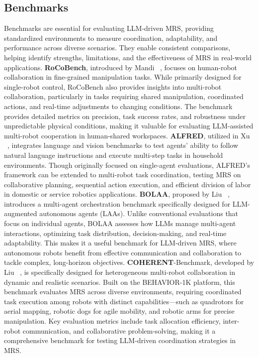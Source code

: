 \subsection{Benchmarks} 
Benchmarks are essential for evaluating LLM-driven MRS, providing standardized environments to measure coordination, adaptability, and performance across diverse scenarios. They enable consistent comparisons, helping identify strengths, limitations, and the effectiveness of MRS in real-world applications.
\textbf{RoCoBench}, introduced by Mandi \etal~\cite{mandi_roco_2024}, focuses on human-robot collaboration in fine-grained manipulation tasks. While primarily designed for single-robot control, RoCoBench also provides insights into multi-robot collaboration, particularly in tasks requiring shared manipulation, coordinated actions, and real-time adjustments to changing conditions. The benchmark provides detailed metrics on precision, task success rates, and robustness under unpredictable physical conditions, making it valuable for evaluating LLM-assisted multi-robot cooperation in human-shared workspaces.
\textbf{ALFRED}, utilized in Xu \etal~\cite{xu_scaling_2024}, integrates language and vision benchmarks to test agents' ability to follow natural language instructions and execute multi-step tasks in household environments. Though originally focused on single-agent evaluations, ALFRED's framework can be extended to multi-robot task coordination, testing MRS on collaborative planning, sequential action execution, and efficient division of labor in domestic or service robotics applications.
\textbf{BOLAA}, proposed by Liu \etal~\cite{liu_bolaa_2023}, introduces a multi-agent orchestration benchmark specifically designed for LLM-augmented autonomous agents (LAAs). Unlike conventional evaluations that focus on individual agents, BOLAA assesses how LLMs manage multi-agent interactions, optimizing task distribution, decision-making, and real-time adaptability. This makes it a useful benchmark for LLM-driven MRS, where autonomous robots benefit from effective communication and collaboration to tackle complex, long-horizon objectives.
\textbf{COHERENT}-Benchmark, developed by Liu \etal~\cite{liu_coherent_2024}, is specifically designed for heterogeneous multi-robot collaboration in dynamic and realistic scenarios. Built on the BEHAVIOR-1K platform, this benchmark evaluates MRS across diverse environments, requiring coordinated task execution among robots with distinct capabilities—such as quadrotors for aerial mapping, robotic dogs for agile mobility, and robotic arms for precise manipulation. Key evaluation metrics include task allocation efficiency, inter-robot communication, and collaborative problem-solving, making it a comprehensive benchmark for testing LLM-driven coordination strategies in MRS.
